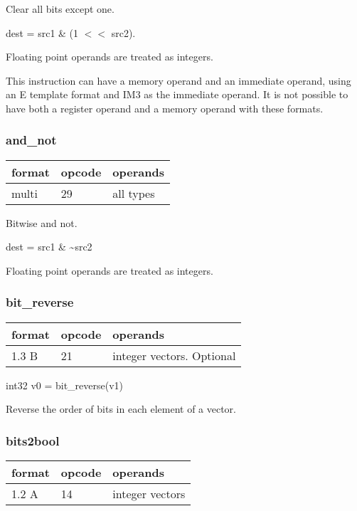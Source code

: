 \documentclass[forwardcom.tex]{subfiles}
\begin{document}
Clear all bits except one. 
\vspace{2mm}

dest = src1 \& (1 $<<$ src2).

\vspace{2mm}
Floating point operands are treated as integers.

\vspace{2mm}
This instruction can have a memory operand and an immediate operand, using an E template format and IM3  as the immediate operand. It is not possible to have both a register operand and a memory operand with these formats.
\vspace{2mm}

\subsubsection{and\_not}
\label{table:andNotInstruction}
\begin{tabular}{|p{12mm}|p{12mm}|p{110mm}|}
\hline
\bfseries format & \bfseries opcode & \bfseries operands \\ \hline
multi & 29 & all types \\ \hline
\end{tabular}
\vspace{2mm}

Bitwise and not.

dest = src1 \& \~{}src2
\vspace{2mm}

Floating point operands are treated as integers.

\subsubsection{bit\_reverse}
\label{table:bitReverseInstruction}
\begin{tabular}{|p{12mm}|p{12mm}|p{110mm}|}
\hline
\bfseries format & \bfseries opcode & \bfseries operands \\ \hline
1.3 B & 21 & integer vectors. Optional \\ \hline
\end{tabular}
\vspace{2mm}

int32 v0 = bit\_reverse(v1)
\vspace{2mm}

Reverse the order of bits in each element of a vector.

\subsubsection{bits2bool}
\label{table:bits2boolInstruction}
\begin{tabular}{|p{12mm}|p{12mm}|p{110mm}|}
\hline
\bfseries format & \bfseries opcode & \bfseries operands \\ \hline
1.2 A & 14 & integer vectors \\ \hline
\end{tabular}
\vspace{2mm}
\end{document}
